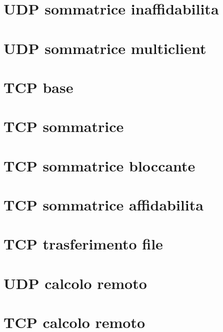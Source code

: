 \documentclass[11pt]{article}
\begin{document}
\section{UDP sommatrice inaffidabilita}

\newpage

\section{UDP sommatrice multiclient}

\newpage

\section{TCP base}

\newpage

\section{TCP sommatrice}

\newpage

\section{TCP sommatrice bloccante}

\newpage

\section{TCP sommatrice affidabilita}

\newpage

\section{TCP trasferimento file}

\newpage

\section{UDP calcolo remoto}

\newpage

\section{TCP calcolo remoto}

\newpage
\end{document}
